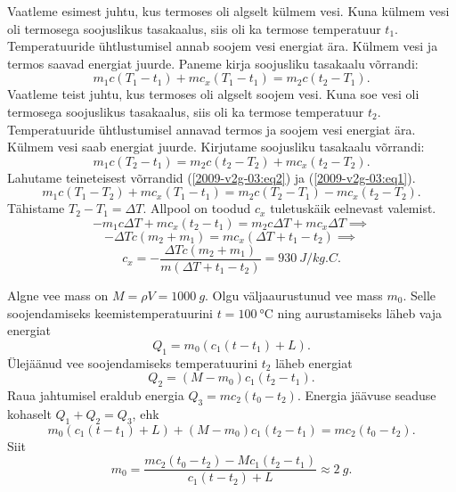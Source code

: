 \documentclass[10pt]{article}
\begin{document}
{Vaatleme esimest juhtu, kus termoses oli algselt külmem vesi. Kuna külmem vesi oli termosega soojuslikus tasakaalus, siis oli ka termose temperatuur $t_1$. Temperatuuride
ühtlustumisel annab soojem vesi energiat ära. Külmem vesi ja termos saavad energiat juurde. Paneme kirja soojusliku tasakaalu võrrandi:
\begin{equation}
m_{1} c\left(T_{1}-t_{1}\right)+m c_{x}\left(T_{1}-t_{1}\right)=m_{2} c\left(t_{2}-T_{1}\right).
\label{2009-v2g-03:eq1}
\end{equation}
Vaatleme teist juhtu, kus termoses oli algselt soojem vesi. Kuna soe vesi oli termosega soojuslikus tasakaalus, siis oli ka termose temperatuur $t_2$. Temperatuuride
ühtlustumisel annavad termos ja soojem vesi energiat ära. Külmem vesi saab energiat juurde. Kirjutame soojusliku tasakaalu võrrandi:
\begin{equation}
m_{1} c\left(T_{2}-t_{1}\right)=m_{2} c\left(t_{2}-T_{2}\right)+m c_{x}\left(t_{2}-T_{2}\right).
\label{2009-v2g-03:eq2}
\end{equation}
Lahutame teineteisest võrrandid (\ref{2009-v2g-03:eq2}) ja (\ref{2009-v2g-03:eq1}).
\[
m_{1} c\left(T_{1}-T_{2}\right)+m c_{x}\left(T_{1}-t_{1}\right)=m_{2} c\left(T_{2}-T_{1}\right)-m c_{x}\left(t_{2}-T_{2}\right).
\]
Tähistame $T_2 - T_1 = \Delta T$. Allpool on toodud $c_x$ tuletuskäik eelnevast valemist.
\[
-m_{1} c \Delta T+m c_{x}\left(t_{2}-t_{1}\right)=m_{2} c \Delta T+m c_{x} \Delta T\implies
\]
\[
-\Delta T c\left(m_{2}+m_{1}\right)=m c_{x}\left(\Delta T+t_{1}-t_{2}\right)\implies
\]
\[
c_{x}=-\frac{\Delta T c\left(m_{2}+m_{1}\right)}{m\left(\Delta T+t_{1}-t_{2}\right)}=\SI{930}{J/kg.C}.
\]
\probend
\bigskip


\solu
Algne vee mass on $M=\rho V=\SI{1000}{g}$. Olgu väljaaurustunud vee mass $m_0$. Selle soojendamiseks keemistemperatuurini $t=\SI{100}{\degreeCelsius}$ ning aurustamiseks läheb vaja energiat
\[
Q_1=m_0(c_1(t-t_1)+L).
\]
Ülejäänud vee soojendamiseks temperatuurini $t_2$ läheb energiat
\[
Q_2=(M-m_0)c_1(t_2-t_1).
\]
Raua jahtumisel eraldub energia $Q_3=mc_2(t_0-t_2)$. Energia jäävuse seaduse kohaselt $Q_1+Q_2=Q_3$, ehk
\[
m_0(c_1(t-t_1)+L)+(M-m_0)c_1(t_2-t_1)=mc_2(t_0-t_2).
\]
Siit
\[
m_0=\frac{mc_2(t_0-t_2)-Mc_1(t_2-t_1)}{c_1(t-t_2)+L}\approx \SI{2}{g}.
\]
\probend
\bigskip


}
\end{document}
